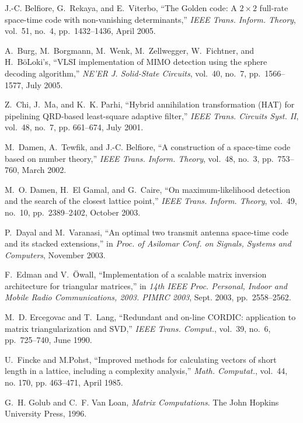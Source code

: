 \documentclass[12pt,onecolumn,draftclsnofoot]{IEEEtran}
\begin{document}
\begin{thebibliography}{10}

J.-C. Belfiore, G.~Rekaya, and E.~Viterbo, ``The Golden code: A
$2\times 2$ full-rate space-time code with non-vanishing
determinants,'' \emph{{IEEE} Trans. Inform. Theory}, vol.~51, no.~4,
pp.~1432--1436, April 2005.

A.~Burg, M.~Borgmann, M.~Wenk, M.~Zellwegger, W.~Fichtner, and
H.~B{\"o}Loki's, ``{VLSI} implementation of {MIMO} detection using
the sphere decoding   algorithm,'' \emph{{NE'ER} J. Solid-State
Circuits}, vol.~40, no.~7, pp.~1566--1577, July 2005.

Z.~Chi, J.~Ma, and K.~K. Parhi, ``Hybrid annihilation transformation
{(HAT)}  for pipelining {QRD}-based least-square adaptive filter,''
\emph{{IEEE}  Trans. Circuits Syst. {II}}, vol.~48, no.~7, pp.
661--674, July 2001.

M.~Damen, A.~Tewfik, and J.-C. Belfiore, ``A construction of a
space-time code based on number theory,'' \emph{{IEEE} Trans.
Inform. Theory}, vol.~48, no.~3, pp.~753--760, March 2002.

M.~O. Damen, H.~{El Gamal}, and G.~Caire, ``On maximum-likelihood
detection and  the search of the closest lattice point,''
\emph{{IEEE} Trans. Inform. Theory}, vol.~49, no.~10,
pp.~2389--2402, October 2003.

P.~Dayal and M.~Varanasi, ``An optimal two transmit antenna
space-time code and   its stacked extensions,'' in \emph{Proc. of
Asilomar Conf. on Signals, Systems and Computers}, November 2003.

F.~Edman and V.~{\"O}wall, ``Implementation of a scalable matrix
inversion architecture for triangular matrices,'' in \emph{14th IEEE
Proc. Personal, Indoor and Mobile Radio Communications, 2003. PIMRC
2003}, Sept. 2003, pp.~2558--2562.

M.~D. Ercegovac and T.~Lang, ``Redundant and on-line {CORDIC}:
application to  matrix triangularization and {SVD},'' \emph{{IEEE}
Trans. Comput.}, vol.~39, no.~6, pp.~725--740, June 1990.

U.~Fincke and M.Pohst, ``Improved methods for calculating vectors of
short length in a lattice, including a complexity analysis,''
\emph{Math. Computat.}, vol.~44, no. 170, pp. 463--471, April 1985.

G.~H. Golub and C.~F. {Van Loan}, \emph{Matrix Computations}.
 The John Hopkins University Press, 1996.


\end{thebibliography}
\end{document}
